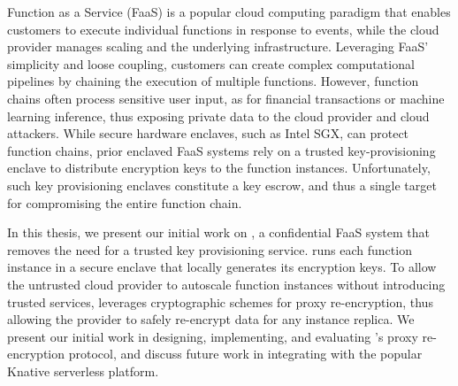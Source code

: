 Function as a Service (FaaS) is a popular cloud computing paradigm that
enables customers to execute individual functions in response to events, while
the cloud provider manages scaling and the underlying infrastructure.
%
Leveraging FaaS' simplicity and loose coupling, customers can create complex
computational pipelines by chaining the execution of multiple functions.
%
However, function chains often process sensitive user input, as for financial
transactions or machine learning inference, thus exposing private data to the
cloud provider and cloud attackers.
%
While secure hardware enclaves, such as Intel SGX, can protect function chains,
prior enclaved FaaS systems rely on a trusted key-provisioning enclave
to distribute encryption keys to the function instances.
%
Unfortunately,
such key provisioning enclaves constitute a key escrow, and thus a single target for
compromising the entire function chain.


In this thesis, we present our initial work on \Name, a confidential FaaS
system that removes the need for a trusted key provisioning service.
%
\Name runs each function instance in a secure enclave that locally generates
its encryption keys.
%
To allow the untrusted cloud provider to autoscale function instances without
introducing trusted services, \Name leverages cryptographic schemes for proxy
re-encryption, thus allowing the provider to safely re-encrypt data for any
instance replica.
%
We present our initial work in designing, implementing, and evaluating \Name's
proxy re-encryption protocol, and discuss future work in integrating \Name with
the popular Knative serverless platform.
